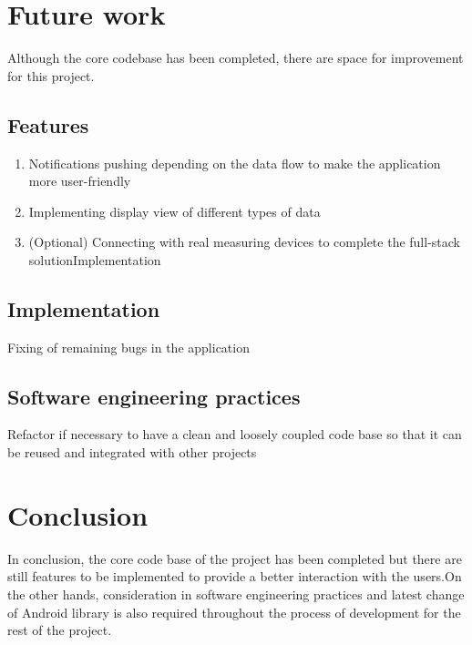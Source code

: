 \section{Future work} \label{sec:Work done so far}
Although the core codebase has been completed, there are space for improvement for this project.
\subsection{Features}
\begin{enumerate}
    \item Notifications pushing depending on the data flow to make the application more
        user-friendly
    \item Implementing display view of different types of data
    \item (Optional) Connecting with real measuring devices
        to complete the full-stack solutionImplementation
\end{enumerate}

\subsection{Implementation}
Fixing of remaining bugs in the application

\subsection{Software engineering practices}
Refactor if necessary to have a clean and loosely coupled code base so that it can be reused and integrated with other projects

\section{Conclusion}
In conclusion, the core code base of the project has been completed but there are still features to
be implemented to provide a better interaction with the users.On the other hands, consideration in software engineering
practices and latest change of Android library is also required throughout the process of development for the rest of
the project.
\vfill

 


